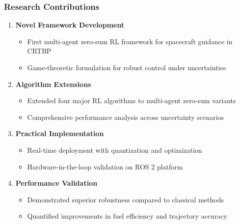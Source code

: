 \documentclass[
    11pt, %
    aspectratio=169, %
]{beamer}
\begin{document}
\begin{frame}
	\frametitle{Research Contributions}
	
	\begin{enumerate}
		\item \textbf{Novel Framework Development}
		\begin{itemize}
			\item First multi-agent zero-sum RL framework for spacecraft guidance in CRTBP
			\item Game-theoretic formulation for robust control under uncertainties
		\end{itemize}
		
		\item \textbf{Algorithm Extensions}
		\begin{itemize}
			\item Extended four major RL algorithms to multi-agent zero-sum variants
			\item Comprehensive performance analysis across uncertainty scenarios
		\end{itemize}
		
		\item \textbf{Practical Implementation}
		\begin{itemize}
			\item Real-time deployment with quantization and optimization
			\item Hardware-in-the-loop validation on ROS 2 platform
		\end{itemize}
		
		\item \textbf{Performance Validation}
		\begin{itemize}
			\item Demonstrated superior robustness compared to classical methods
			\item Quantified improvements in fuel efficiency and trajectory accuracy
		\end{itemize}
	\end{enumerate}
\end{frame}
\end{document}
